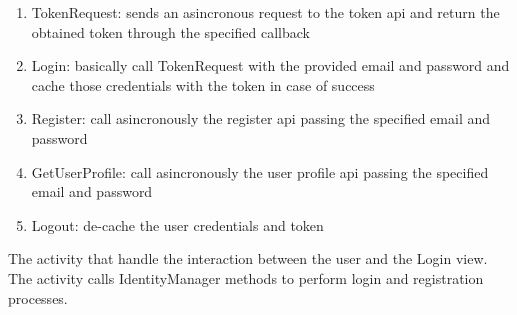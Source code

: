 \begin{enumerate}
\item TokenRequest: sends an asincronous request to the token api and return the obtained token through the specified callback
\item Login: basically call TokenRequest with the provided email and password and cache those credentials with the token in case of success
\item Register: call asincronously the register api passing the specified email and password
\item GetUserProfile: call asincronously the user profile api passing the specified email and password
\item Logout: de-cache the user credentials and token
\end{enumerate}


The activity that handle the interaction between the user and the Login view. The activity calls IdentityManager methods to perform login and registration processes.

